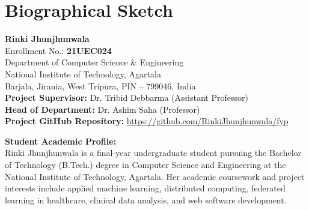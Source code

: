 \documentclass[12pt,a4paper,oneside]{report}
\begin{document}
\appendix
\chapter{Biographical Sketch}
\label{chap:appendix_bio}

\vspace{1.0cm}

\begin{center}
    {\Large \textbf{Rinki Jhunjhunwala}}\\
    \vspace{0.2cm}
    Enrollment No.: \textbf{21UEC024}\\
    Department of Computer Science \& Engineering\\
    National Institute of Technology, Agartala\\
    Barjala, Jirania, West Tripura, PIN -- 799046, India\\
    \vspace{0.3cm}
    \textbf{Project Supervisor:} Dr. Tribid Debbarma (Assistant Professor)\\
    \textbf{Head of Department:} Dr. Ashim Saha (Professor)\\
    \vspace{0.2cm}
    \textbf{Project GitHub Repository:} \url{https://github.com/RinkiJhunjhunwala/fyp}
\end{center}

\vspace{1cm}

\noindent \textbf{Student Academic Profile:}\\
Rinki Jhunjhunwala is a final-year undergraduate student pursuing the Bachelor of Technology (B.Tech.) degree in Computer Science and Engineering at the National Institute of Technology, Agartala. Her academic coursework and project interests include applied machine learning, distributed computing, federated learning in healthcare, clinical data analysis, and web software development.

\vspace{0.8cm}
\end{document}
